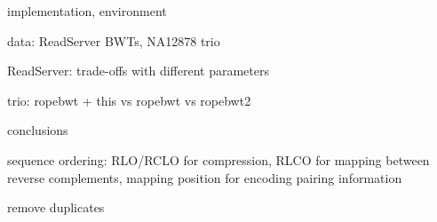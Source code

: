 \documentclass[smallabstract,smallcaptions]{dccpaper}
\begin{document}

implementation, environment

data: ReadServer BWTs, NA12878 trio

ReadServer: trade-offs with different parameters

trio: ropebwt + this vs ropebwt vs ropebwt2



conclusions

sequence ordering: RLO/RCLO for compression, RLCO for mapping between reverse complements, mapping position for encoding pairing information

remove duplicates


%
%
\end{document}
